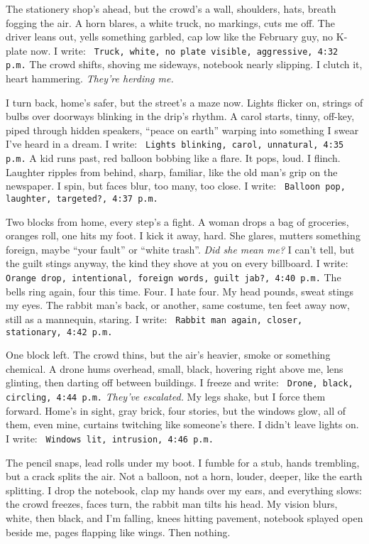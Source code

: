 \documentclass[12pt]{article} %
\newcommand{\note}[1]{\texttt{\small \color{DarkGray} #1}}
\begin{document}
The stationery shop’s ahead, but the crowd’s a wall, shoulders, hats, breath fogging the air. A horn blares, a white truck, no markings, cuts me off. The driver leans out, yells something garbled, cap low like the February guy, no K-plate now. I write: \note{Truck, white, no plate visible, aggressive, 4:32 p.m.} The crowd shifts, shoving me sideways, notebook nearly slipping. I clutch it, heart hammering. \textit{They’re herding me.}

I turn back, home’s safer, but the street’s a maze now. Lights flicker on, strings of bulbs over doorways blinking in the drip’s rhythm. A carol starts, tinny, off-key, piped through hidden speakers, “peace on earth” warping into something I swear I’ve heard in a dream. I write: \note{Lights blinking, carol, unnatural, 4:35 p.m.} A kid runs past, red balloon bobbing like a flare. It pops, loud. I flinch. Laughter ripples from behind, sharp, familiar, like the old man’s grip on the newspaper. I spin, but faces blur, too many, too close. I write: \note{Balloon pop, laughter, targeted?, 4:37 p.m.}

Two blocks from home, every step’s a fight. A woman drops a bag of groceries, oranges roll, one hits my foot. I kick it away, hard. She glares, mutters something foreign, maybe “your fault” or “white trash”. \textit{Did she mean me?} I can’t tell, but the guilt stings anyway, the kind they shove at you on every billboard. I write: \note{Orange drop, intentional, foreign words, guilt jab?, 4:40 p.m.} The bells ring again, four this time. Four. I hate four. My head pounds, sweat stings my eyes. The rabbit man’s back, or another, same costume, ten feet away now, still as a mannequin, staring. I write: \note{Rabbit man again, closer, stationary, 4:42 p.m.}

One block left. The crowd thins, but the air’s heavier, smoke or something chemical. A drone hums overhead, small, black, hovering right above me, lens glinting, then darting off between buildings. I freeze and write: \note{Drone, black, circling, 4:44 p.m.} \textit{They’ve escalated.} My legs shake, but I force them forward. Home’s in sight, gray brick, four stories, but the windows glow, all of them, even mine, curtains twitching like someone’s there. I didn’t leave lights on. I write: \note{Windows lit, intrusion, 4:46 p.m.}

The pencil snaps, lead rolls under my boot. I fumble for a stub, hands trembling, but a crack splits the air. Not a balloon, not a horn, louder, deeper, like the earth splitting. I drop the notebook, clap my hands over my ears, and everything slows: the crowd freezes, faces turn, the rabbit man tilts his head. My vision blurs, white, then black, and I’m falling, knees hitting pavement, notebook splayed open beside me, pages flapping like wings. Then nothing.
\end{document}
